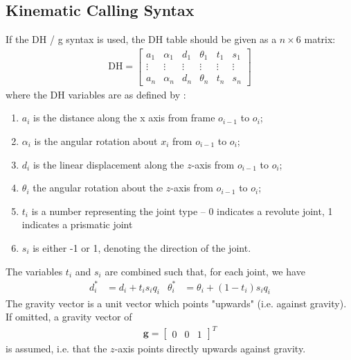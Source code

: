 \documentclass[12pt]{article}
\begin{document}
\subsection{Kinematic Calling Syntax}
If the DH / g syntax is used, the DH table should be given as a $n\times 6$ matrix:
\begin{align}
	\text{DH} = \begin{bmatrix}
		a_1 & \alpha_1 & d_1 & \theta_1 & t_1 & s_1\\
		\vdots &\vdots &\vdots &\vdots &\vdots &\vdots\\
		a_n & \alpha_n & d_n & \theta_n & t_n & s_n
	\end{bmatrix}
\end{align}
where the DH variables are as defined by \cite{spong2008}:
\begin{enumerate}[nosep]
	\item $a_i$ is the distance along the x axis from frame $o_{i-1}$ to $o_i$;
	\item $\alpha_i$ is the angular rotation about $x_i$ from $o_{i-1}$ to $o_i$;
	\item $d_i$ is the linear displacement along the $z$-axis from $o_{i-1}$ to $o_i$;
	\item $\theta_i$ the angular rotation about the $z$-axis from $o_{i-1}$ to $o_i$;
	\item $t_i$ is a number representing the joint type -- 0 indicates a revolute joint, 1 indicates a prismatic joint
	\item $s_i$ is either -1 or 1, denoting the direction of the joint.
\end{enumerate}
The variables $t_i$ and $s_i$ are combined such that, for each joint, we have
\begin{align}
	d_i^* &= d_i + t_i s_i q_i &
	\theta_i^* &= \theta_i + (1-t_i)s_i q_i
\end{align}
The gravity vector is a unit vector which points "upwards" (i.e. against gravity). If omitted, a gravity vector of
\begin{align}
	\mathbf{g} = \begin{bmatrix} 0 & 0 & 1\end{bmatrix}^T
\end{align}
is assumed, i.e. that the $z$-axis points directly upwards against gravity.
\end{document}
